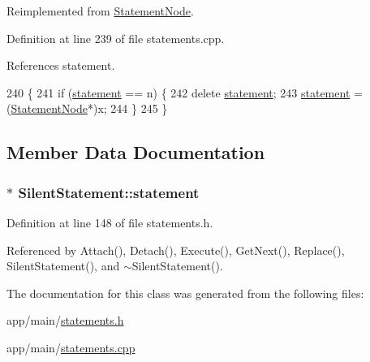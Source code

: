 Reimplemented from \hyperlink{classStatementNode_a713efe48098d7f07c6014ca7ba337553}{Statement\+Node}.



Definition at line 239 of file statements.\+cpp.



References statement.


\begin{DoxyCode}
240 \{
241     \textcolor{keywordflow}{if} (\hyperlink{classSilentStatement_a0b9a037a637e7b96459b0540185241d1}{statement} == n) \{
242         \textcolor{keyword}{delete} \hyperlink{classSilentStatement_a0b9a037a637e7b96459b0540185241d1}{statement};
243         \hyperlink{classSilentStatement_a0b9a037a637e7b96459b0540185241d1}{statement} = (\hyperlink{classStatementNode}{StatementNode}*)x;
244     \}
245 \}
\end{DoxyCode}


\subsection{Member Data Documentation}
\subsubsection[{\texorpdfstring{statement}{statement}}]{$\ast$ Silent\+Statement\+::statement\hspace{0.3cm}{\ttfamily [private]}}\hypertarget{classSilentStatement_a0b9a037a637e7b96459b0540185241d1}{}\label{classSilentStatement_a0b9a037a637e7b96459b0540185241d1}


Definition at line 148 of file statements.\+h.



Referenced by Attach(), Detach(), Execute(), Get\+Next(), Replace(), Silent\+Statement(), and $\sim$\+Silent\+Statement().



The documentation for this class was generated from the following files\+:\begin{DoxyCompactItemize}
\item 
app/main/\hyperlink{statements_8h}{statements.\+h}\item 
app/main/\hyperlink{statements_8cpp}{statements.\+cpp}\end{DoxyCompactItemize}
